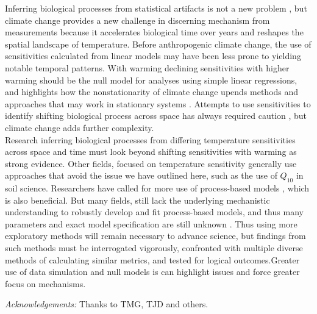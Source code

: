 \documentclass[11pt,letter]{article}
\begin{document}
Inferring biological processes from statistical artifacts is not a new problem \citep[e.g.,][]{nee2005}, but climate change provides a new challenge in discerning mechanism from measurements because it accelerates biological time over years and reshapes the spatial landscape of temperature. Before anthropogenic climate change, the use of sensitivities calculated from linear models may have been less prone to yielding notable temporal patterns. With warming declining sensitivities with higher warming should be the null model for analyses using simple linear regressions, and highlights how the nonstationarity of climate change upends methods and approaches that may work in stationary systems \citep{Milly:2008yu,tempeco}.  Attempts to use sensitivities to identify shifting biological process across space has always required caution \citep[e.g.,][]{Phillimore2012,tansey2017}, but climate change adds further complexity. \\

Research inferring biological processes from differing temperature sensitivities across space and time must look beyond shifting sensitivities with warming as strong evidence. Other fields, focused on temperature sensitivity generally use approaches that avoid the issue we have outlined here, such as the use of $Q_{10}$ in soil science. Researchers have called for more use of process-based models \citep{keenan2019}, which is also beneficial. But many fields, still lack the underlying mechanistic understanding to robustly develop and fit process-based models, and thus many parameters and exact model specification are still unknown \citep{chuine2016}. Thus using more exploratory methods will remain necessary to advance science, but findings from such methods must be interrogated vigorously, confronted with multiple diverse methods of calculating similar metrics, and tested for logical outcomes.Greater use of data simulation and null models is can highlight issues and force greater focus on mechanisms. 

\emph{Acknowledgements:} Thanks to TMG, TJD and others. 



\end{document}
